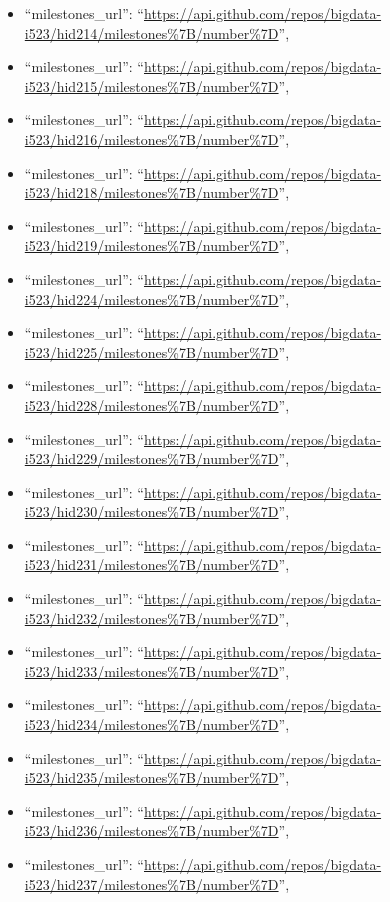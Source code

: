 \begin{itemize}
\item
  ``milestones\_url'':
  ``\url{https://api.github.com/repos/bigdata-i523/hid214/milestones\%7B/number\%7D}'',
\item
  ``milestones\_url'':
  ``\url{https://api.github.com/repos/bigdata-i523/hid215/milestones\%7B/number\%7D}'',
\item
  ``milestones\_url'':
  ``\url{https://api.github.com/repos/bigdata-i523/hid216/milestones\%7B/number\%7D}'',
\item
  ``milestones\_url'':
  ``\url{https://api.github.com/repos/bigdata-i523/hid218/milestones\%7B/number\%7D}'',
\item
  ``milestones\_url'':
  ``\url{https://api.github.com/repos/bigdata-i523/hid219/milestones\%7B/number\%7D}'',
\item
  ``milestones\_url'':
  ``\url{https://api.github.com/repos/bigdata-i523/hid224/milestones\%7B/number\%7D}'',
\item
  ``milestones\_url'':
  ``\url{https://api.github.com/repos/bigdata-i523/hid225/milestones\%7B/number\%7D}'',
\item
  ``milestones\_url'':
  ``\url{https://api.github.com/repos/bigdata-i523/hid228/milestones\%7B/number\%7D}'',
\item
  ``milestones\_url'':
  ``\url{https://api.github.com/repos/bigdata-i523/hid229/milestones\%7B/number\%7D}'',
\item
  ``milestones\_url'':
  ``\url{https://api.github.com/repos/bigdata-i523/hid230/milestones\%7B/number\%7D}'',
\item
  ``milestones\_url'':
  ``\url{https://api.github.com/repos/bigdata-i523/hid231/milestones\%7B/number\%7D}'',
\item
  ``milestones\_url'':
  ``\url{https://api.github.com/repos/bigdata-i523/hid232/milestones\%7B/number\%7D}'',
\item
  ``milestones\_url'':
  ``\url{https://api.github.com/repos/bigdata-i523/hid233/milestones\%7B/number\%7D}'',
\item
  ``milestones\_url'':
  ``\url{https://api.github.com/repos/bigdata-i523/hid234/milestones\%7B/number\%7D}'',
\item
  ``milestones\_url'':
  ``\url{https://api.github.com/repos/bigdata-i523/hid235/milestones\%7B/number\%7D}'',
\item
  ``milestones\_url'':
  ``\url{https://api.github.com/repos/bigdata-i523/hid236/milestones\%7B/number\%7D}'',
\item
  ``milestones\_url'':
  ``\url{https://api.github.com/repos/bigdata-i523/hid237/milestones\%7B/number\%7D}'',

\end{itemize}
